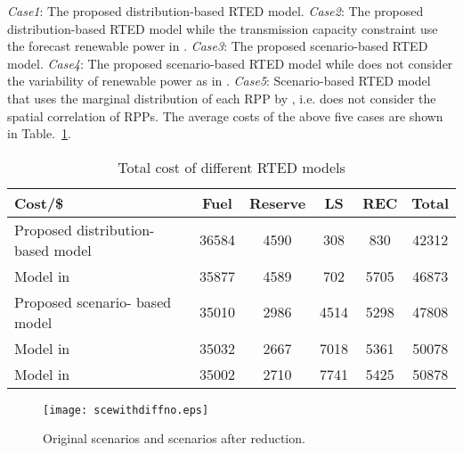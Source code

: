 {\it Case1}: The proposed distribution-based RTED model. {\it Case2}: The proposed distribution-based RTED model while the transmission capacity constraint use the forecast renewable power in \cite{VersatileMixture}. {\it Case3}: The proposed scenario-based RTED model. {\it Case4}: The proposed scenario-based RTED model while does not consider the variability of renewable power as in \cite{copula_Zhang}. {\it Case5}: Scenario-based RTED model that uses the marginal distribution of each RPP by \cite{sce_generation_Ma}, i.e. does not consider the spatial correlation of RPPs. The average costs of the above five cases are shown in Table.~\ref{cost}.

\begin{table}[h]
	\caption{{Total cost of different RTED models}}
	\label{cost}
	\begin{center}
		\begin{tabular}{|p{2.6cm}<{\centering}|c|c|c|c|c|}
			\hline
			{Cost/\$} & Fuel & Reserve & LS & REC & Total\\ \hline
			Proposed distribution- based model & \rule{0pt}{0.3cm} 36584 &4590&308&830& 42312\\\hline
			Model in \cite{VersatileMixture} &35877  & 4589& 702& 5705& 46873 \\\hline
			Proposed scenario- based model & \rule{0pt}{0.3cm} 35010 & 2986& 4514& 5298& 47808\\\hline
			Model in \cite{copula_Zhang} & 35032 & 2667& 7018& 5361& 50078\\ \hline
			Model in \cite{sce_generation_Ma} &35002& 2710 & 7741& 5425& 50878  \\ \hline

		\end{tabular}
	\end{center}
\end{table}

\begin{figure}[ht]
	\begin{center}
		\texttt{[image: scewithdiffno.eps]}\\
		\caption{{Original scenarios and scenarios after reduction.}}\label{reducedscenarios}
	\end{center}
\end{figure}

